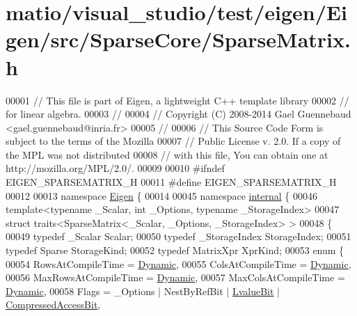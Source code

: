 \hypertarget{matio_2visual__studio_2test_2eigen_2_eigen_2src_2_sparse_core_2_sparse_matrix_8h_source}{}\section{matio/visual\+\_\+studio/test/eigen/\+Eigen/src/\+Sparse\+Core/\+Sparse\+Matrix.h}
\label{matio_2visual__studio_2test_2eigen_2_eigen_2src_2_sparse_core_2_sparse_matrix_8h_source}

\begin{DoxyCode}
00001 \textcolor{comment}{// This file is part of Eigen, a lightweight C++ template library}
00002 \textcolor{comment}{// for linear algebra.}
00003 \textcolor{comment}{//}
00004 \textcolor{comment}{// Copyright (C) 2008-2014 Gael Guennebaud <gael.guennebaud@inria.fr>}
00005 \textcolor{comment}{//}
00006 \textcolor{comment}{// This Source Code Form is subject to the terms of the Mozilla}
00007 \textcolor{comment}{// Public License v. 2.0. If a copy of the MPL was not distributed}
00008 \textcolor{comment}{// with this file, You can obtain one at http://mozilla.org/MPL/2.0/.}
00009 
00010 \textcolor{preprocessor}{#ifndef EIGEN\_SPARSEMATRIX\_H}
00011 \textcolor{preprocessor}{#define EIGEN\_SPARSEMATRIX\_H}
00012 
00013 \textcolor{keyword}{namespace }\hyperlink{namespace_eigen}{Eigen} \{ 
00014 
00045 \textcolor{keyword}{namespace }\hyperlink{namespaceinternal}{internal} \{
00046 \textcolor{keyword}{template}<\textcolor{keyword}{typename} \_Scalar, \textcolor{keywordtype}{int} \_Options, \textcolor{keyword}{typename} \_StorageIndex>
00047 \textcolor{keyword}{struct }traits<SparseMatrix<\_Scalar, \_Options, \_StorageIndex> >
00048 \{
00049   \textcolor{keyword}{typedef} \_Scalar Scalar;
00050   \textcolor{keyword}{typedef} \_StorageIndex StorageIndex;
00051   \textcolor{keyword}{typedef} Sparse StorageKind;
00052   \textcolor{keyword}{typedef} MatrixXpr XprKind;
00053   \textcolor{keyword}{enum} \{
00054     RowsAtCompileTime = \hyperlink{namespace_eigen_ad81fa7195215a0ce30017dfac309f0b2}{Dynamic},
00055     ColsAtCompileTime = \hyperlink{namespace_eigen_ad81fa7195215a0ce30017dfac309f0b2}{Dynamic},
00056     MaxRowsAtCompileTime = \hyperlink{namespace_eigen_ad81fa7195215a0ce30017dfac309f0b2}{Dynamic},
00057     MaxColsAtCompileTime = \hyperlink{namespace_eigen_ad81fa7195215a0ce30017dfac309f0b2}{Dynamic},
00058     Flags = \_Options | NestByRefBit | \hyperlink{group__flags_gae2c323957f20dfdc6cb8f44428eaec1a}{LvalueBit} | \hyperlink{group__flags_gaed0244284da47a2b8661261431173caf}{CompressedAccessBit},

\end{DoxyCode}
